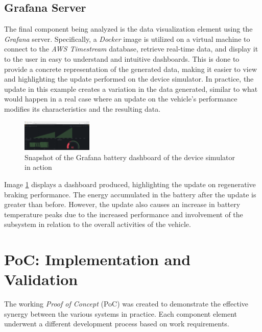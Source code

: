 \documentclass[10pt,a4paper,roman, twocolumn]{article}
\begin{document}
\subsection{Grafana Server}
The final component being analyzed is the data visualization element using the \textit{Grafana} server. Specifically, a \textit{Docker} image is utilized on a virtual machine to connect to the \textit{AWS Timestream} database, retrieve real-time data, and display it to the user in easy to understand and intuitive dashboards.
This is done to provide a concrete representation of the generated data, making it easier to view and highlighting the update performed on the device simulator. In practice, the update in this example creates a variation in the data generated, similar to what would happen in a real case where an update on the vehicle's performance modifies its characteristics and the resulting data.
\begin{figure} [tbh]
	\centerline{\includegraphics[width=0.3\textwidth]{images/grafana_Battery.png}}
	\caption{Snapshot of the Grafana battery dashboard of the device simulator in action}
	\label{fig:GrafanaBattery}
\end{figure}

Image \ref{fig:GrafanaBattery} displays a dashboard produced, highlighting the update on regenerative braking performance. The energy accumulated in the battery after the update is greater than before. However, the update also causes an increase in battery temperature peaks due to the increased performance and involvement of the subsystem in relation to the overall activities of the vehicle.

\section{PoC: Implementation and Validation}
The working \textit{Proof of Concept} (PoC) was created to demonstrate the effective synergy between the various systems in practice. Each component element underwent a different development process based on work requirements.
\end{document}
